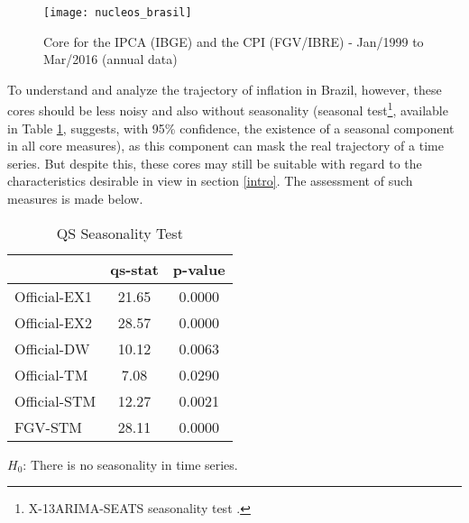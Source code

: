 \documentclass[10pt]{article}
\begin{document}
\begin{figure}[h]
  \centering
  \texttt{[image: nucleos\_brasil]} %
  \caption{Core for the IPCA (IBGE) and the CPI (FGV/IBRE) - Jan/1999 to Mar/2016 (annual data)}
  \label{nucleos_brasil}
\end{figure}

To understand and analyze the trajectory of inflation in Brazil, however, these cores should be less noisy and also without seasonality (seasonal test\footnote{X-13ARIMA-SEATS seasonality test \citep{x13}.}, available in Table \ref{qs_nucleos}, suggests, with 95\% confidence, the existence of a seasonal component in all core measures), as this component can mask the real trajectory of a time series. But despite this, these cores may still be suitable with regard to the characteristics desirable in view in section \ref{intro}. The assessment of such measures is made below.



\begin{table}[h]
\centering
\caption{QS Seasonality Test}\label{qs_nucleos}
\begin{threeparttable}
\begin{tabular}{@{}l|cc@{}}
\toprule
\textbf{}        & \textbf{qs-stat} & \textbf{p-value} \\ \midrule
Official-EX1     & 21.65            & 0.0000           \\
Official-EX2     & 28.57            & 0.0000           \\
Official-DW      & 10.12            & 0.0063           \\
Official-TM      & 7.08             & 0.0290           \\
Official-STM     & 12.27            & 0.0021           \\
FGV-STM          & 28.11            & 0.0000           \\ \bottomrule
\end{tabular}
\begin{tablenotes}
\item \scriptsize{$H_0$: There is no seasonality in time series.}
\end{tablenotes}
\end{threeparttable}
\end{table}
\end{document}
